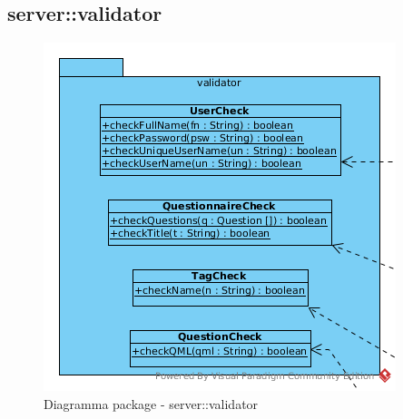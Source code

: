 \begin{description}
\begin{itemize}
\end{itemize}

\end{description}

\vspace{0.5cm}
\subsection{server::validator}
\begin{center}
		\begin{figure}[H]
			\centering \includegraphics[scale=4, max width=\textwidth, max height=\myheight]{../img/diagrammiClassi/server/validator.png}
			\caption{Diagramma package - server::validator}
		\end{figure}
	\end{center}\hypertarget{server::validator::UserCheck}{}
